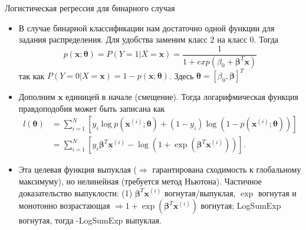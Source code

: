 \documentclass{beamer}
\begin{document}
\begin{frame}{Логистическая регрессия для бинарного случая}
    \footnotesize

    \begin{itemize}
        \item В случае бинарной классификации нам достаточно одной функции для задания распределения. Для удобства заменим класс $2$ на класс $0$. Тогда
        \begin{equation}
            p(\bm{x}; \bm{\theta}) = P(Y = 1 | X = \bm{x}) = \frac{1}{1 + exp(\beta_{0} + \bm{\beta}^T \bm{x})}
        \end{equation}
        так как $P(Y = 0 | X = \bm{x}) = 1 - p(\bm{x}; \bm{\theta})$. Здесь $\bm{\theta} = [\beta_0, \bm{\beta}]^T$
        \item Дополним $\bm{x}$ единицей в начале (смещение). Тогда логарифмическая функция правдоподобия может быть записана как 
        \begin{equation}
        \begin{split}
            l(\bm{\theta}) &= \sum_{i=1}^N \left[ y_i \log p(\bm{x}^{(i)}; \bm{\theta}) + (1 - y_i) \log (1 - p(\bm{x}^{(i)}; \bm{\theta})) \right] \\
            &= \sum_{i=1}^N \left[ y_i \bm{\beta}^T \bm{x}^{(i)} - \log (1 + \exp(\bm{\beta}^T \bm{x}^{(i)})) \right].
        \end{split}
        \end{equation}
        \item Эта целевая функция выпуклая ($\Longrightarrow$ гарантирована сходимость к глобальному максимуму), но нелинейная (требуется метод Ньютона). Частичное доказательство выпуклости: (1) $\bm{\beta}^T \bm{x}^{(i)}$ вогнутая/выпуклая, $\exp$ вогнутая и монотонно возрастающая $\Longrightarrow 1 + \exp(\bm{\beta}^T \bm{x}^{(i)})$ вогнутая; LogSumExp вогнутая, тогда -LogSumExp выпуклая.
        \end{itemize}
\end{frame}
\end{document}
